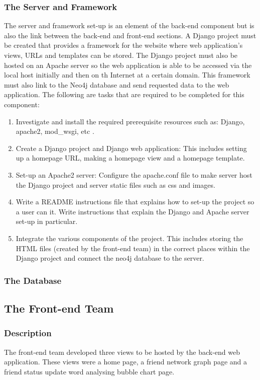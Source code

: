 \documentclass[10pt,onecolumn]{article}
\begin{document}
\subsubsection{The Server and Framework}
The server and framework set-up is an element of the back-end component but is also the link between the back-end and front-end sections. A Django project must be created that provides a framework for the website where web application's views, URLs and templates can be stored. The Django project must also be hosted on an Apache server so the web application is able to be accessed via the local host initially and then on th Internet at a certain domain. This framework must also link to the Neo4j database and send requested data to the web application. The following are tasks that are required to be completed for this component:

\begin{enumerate}
	\item Investigate and install the required prerequisite resources such as: Django, apache2, mod\_wsgi, etc \cite{django}.
	\item Create a Django project and Django web application: This includes setting up a homepage URL, making a homepage view and a homepage template.
	\item Set-up an Apache2 server: Configure the apache.conf file to make server host the Django project and server static files such as css and images.
	\item Write a README instructions file that explains how to set-up the project so a user can it. Write instructions that explain the Django and Apache server set-up in particular.
	\item Integrate the various components of the project. This includes storing the HTML files (created by the front-end team) in the correct places within the Django project and connect the neo4j database to the server.     
\end{enumerate}

\subsubsection{The Database}



\subsection{The Front-end Team}
\subsubsection{Description}
The front-end team developed three views to be hosted by the back-end web application. These views were a home page, a friend network graph page and a friend status update word analysing bubble chart page. 
\end{document}
